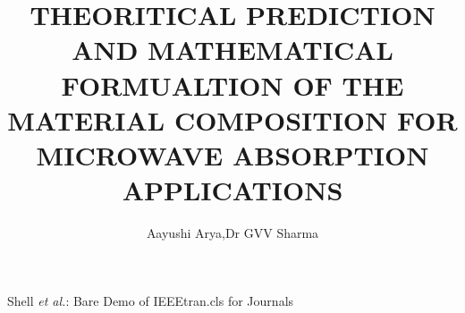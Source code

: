 \documentclass[journal]{IEEEtran}
\begin{document}
%
\title{THEORITICAL PREDICTION AND MATHEMATICAL FORMUALTION OF THE MATERIAL  COMPOSITION FOR MICROWAVE ABSORPTION APPLICATIONS}
%
%
%

\author{Aayushi Arya,Dr GVV Sharma}

% 
%



%
{Shell \MakeLowercase{\textit{et al.}}: Bare Demo of IEEEtran.cls for Journals}
% 
\end{document}
